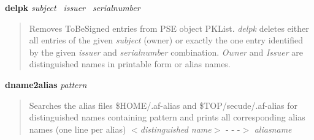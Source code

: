 {\bf delpk} {\em subject}~ {\em issuer}~ {\em serialnumber}
\begin{quote}
Removes ToBeSigned entries from PSE object PKList.
{\em delpk} deletes either all entries of the given {\em subject} (owner) or exactly the one entry identified by 
the
given {\em issuer} and {\em serialnumber} combination. {\em Owner} and {\em Issuer} are distinguished
names in printable form or alias names.
\end{quote}

{\bf dname2alias} {\em pattern}
\begin{quote}
Searches the alias files \$HOME/.af-alias and \$TOP/secude/.af-alias for distinguished names
containing pattern and prints all corresponding alias names (one line per alias)
\bc
$<${\em distinguished name}$>$ - - -$>$  {\em aliasname}
\ec
\end{quote}

